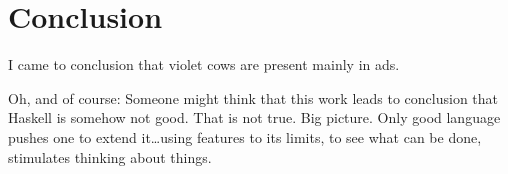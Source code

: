 \documentclass[11pt,oneside,draft]{fithesis2}
\theoremstyle{definition}
\begin{document}


\chapter{Conclusion}

I came to conclusion that violet cows are present mainly in ads.

Oh, and of course:
Someone might think that this work leads to conclusion that Haskell is somehow not good.
That is not true. Big picture. Only good language pushes one to extend it\dots using features
to its limits, to see what can be done, stimulates thinking about things.

\clearpage
{}
{}
%


\end{document}
